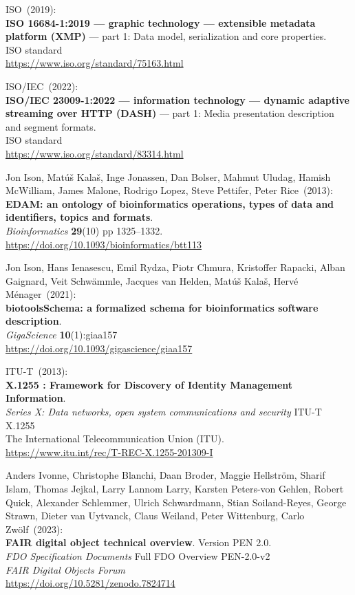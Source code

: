 \begin{thebibliography}{9}
ISO~(2019): \\
\textbf{{ISO} 16684-1:2019 --- graphic technology --- extensible metadata platform (XMP)} --- part 1: Data model, serialization and core properties.\\
ISO standard\\
\url{https://www.iso.org/standard/75163.html}

ISO/IEC~(2022): \\
\textbf{{ISO}/{IEC} 23009-1:2022 --- information technology ---
dynamic adaptive streaming over HTTP (DASH)} --- part 1: Media
presentation description and segment formats.\\
ISO standard\\
\url{https://www.iso.org/standard/83314.html}


Jon Ison, Matúš Kalaš, Inge Jonassen, Dan Bolser, Mahmut Uludag, Hamish McWilliam, James Malone, Rodrigo Lopez, Steve Pettifer, Peter Rice~(2013): \\
\textbf{EDAM: an ontology of bioinformatics operations, types of data and identifiers, topics and formats}.\\
\emph{Bioinformatics} \textbf{29}(10) pp 1325--1332.\\
\url{https://doi.org/10.1093/bioinformatics/btt113}

Jon Ison, Hans Ienasescu, Emil Rydza, Piotr Chmura, Kristoffer Rapacki, Alban Gaignard, Veit Schwämmle, Jacques van Helden, Matúš Kalaš, Hervé Ménager~(2021): \\
\textbf{biotoolsSchema: a formalized schema for bioinformatics software description}.\\
\emph{GigaScience} \textbf{10}(1):giaa157\\
\url{https://doi.org/10.1093/gigascience/giaa157}

ITU-T~(2013): \\
\textbf{X.1255 : Framework for Discovery of Identity Management Information}.\\
\emph{Series X: Data networks, open system communications and security} ITU-T X.1255 \\
The International Telecommunication Union (ITU).\\
\url{https://www.itu.int/rec/T-REC-X.1255-201309-I}

Anders Ivonne, Christophe Blanchi, Daan Broder, Maggie Hellström, Sharif Islam, Thomas Jejkal, Larry Lannom Larry, Karsten Peters-von Gehlen, Robert Quick, Alexander Schlemmer, Ulrich Schwardmann, Stian Soiland-Reyes, George Strawn, Dieter van Uytvanck, Claus Weiland, Peter Wittenburg, Carlo Zwölf~(2023): \\
\textbf{{FAIR} digital object technical overview}. Version PEN 2.0.\\
\emph{FDO Specification Documents} Full FDO Overview PEN-2.0-v2 \\
\emph{FAIR Digital Objects Forum}\\
\url{https://doi.org/10.5281/zenodo.7824714}


\end{thebibliography}
